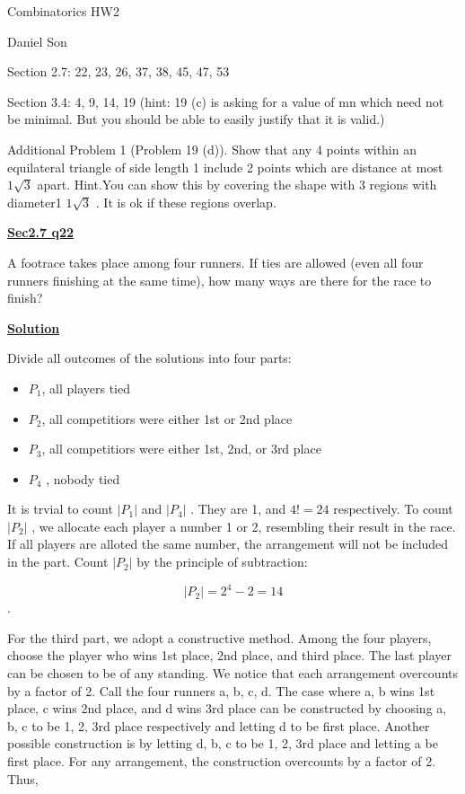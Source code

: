 \documentclass{article}
\newcommand{\new}[1]{
    \vspace{2mm}
    \noindent
    \textbf{
    \underline{#1}}
}
\newcommand{\Pt}[1]{
    $P_{#1}$
}
\newcommand{\Szpt}[1]{
    $|P_{#1}|$
}
\begin{document}
\begin{center}
\LARGE
Combinatorics HW2

\Large
Daniel Son
\end{center}

Section 2.7: 22, 23, 26, 37, 38, 45, 47, 53

Section 3.4: 4, 9, 14, 19 (hint: 19
(c) is asking for a value of mn which need not be minimal. But you should
be able to easily justify that it is valid.)


Additional Problem 1 (Problem 19 (d)). Show that any 4 points within an
equilateral triangle of side length 1 include 2 points which are distance at most
 $1\sqrt{3}$ apart.
Hint.You can show this by covering the shape with 3 regions with diameter1 $1\sqrt{3}$ .
It is ok if these regions overlap.

\new{Sec2.7 q22}
A footrace takes place among four runners. If ties are allowed (even all four 
runners finishing at the same time), how many ways are there for the race to 
finish? 

\new{Solution}
Divide all outcomes of the solutions into four parts:
\begin{itemize}
    \item $P_1$, all players tied
    \item $P_2$, all competitiors were either 1st or 2nd place
    \item $P_3$, all competitiors were either 1st, 2nd, or 3rd place
    \item \Pt{4}, nobody tied
\end{itemize}

It is trvial to count \Szpt{1} and \Szpt{4}. They are 1, and $4! = 24$ respectively. 
To count \Szpt{2}, we allocate each player a number 1 or 2, resembling their 
result in the race. If all 
players are alloted the same number, the arrangement will not be included 
in the part. Count \Szpt{2} by the principle of subtraction:

\[
    |P_2| = 2^4 - 2 = 14
\].

For the third part, we adopt a constructive method. Among the 
four players, choose the player who wins 1st place, 2nd place, and third place. 
The last player can be chosen to be of any standing. We notice that 
each arrangement overcounts by a factor of 2. Call the four runners 
a, b, c, d. The case where a, b wins 1st place, c wins 2nd place, 
and d wins 3rd place can be constructed by choosing 
a, b, c to be 1, 2, 3rd place respectively and letting d to be first place. 
Another possible construction is by letting d, b, c to be 1, 2, 3rd place 
and letting a be first place. For any arrangement, the construction 
overcounts by a factor of 2. Thus, 
\end{document}
